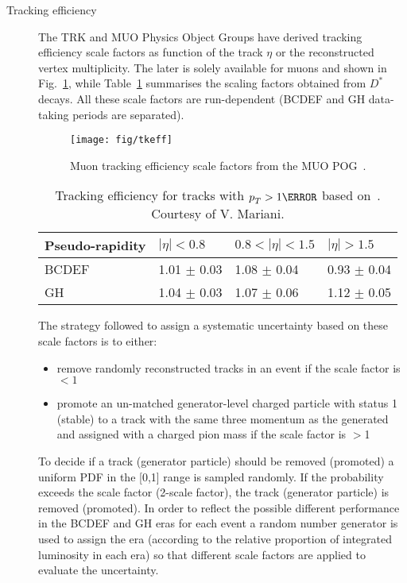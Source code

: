 \begin{description}
\item[Tracking efficiency]
The TRK and MUO Physics Object Groups have derived tracking efficiency scale factors as function of the track $\eta$ or the reconstructed vertex multiplicity. The later is solely available for muons and shown in Fig.~\ref{fig:mutksf}, while Table~\ref{tab:dstartsf} summarises the scaling factors obtained from $D^*$ decays. All these scale factors are run-dependent (BCDEF and GH data-taking periods are separated).

\begin{figure}[htp]
  \centering
  \texttt{[image: fig/tkeff]}%
  \caption{Muon tracking efficiency scale factors from the MUO POG~\cite{twiki:MUO}.}
  \label{fig:mutksf}
\end{figure}

\begin{table}[htb]
\begin{center}
\caption{Tracking efficiency for tracks with $\pt>1\GeV$ based on~\cite{CMS-AN-2015-048,twiki:trkpogeff,CMS-DP-2016-012}.
Courtesy of V. Mariani.}
\label{tab:dstartsf}
\begin{tabular}{llll}
\hline
Pseudo-rapidity & $|\eta|<0.8$ & $0.8<|\eta|<1.5$ & $|\eta|>1.5$ \\
\hline
BCDEF & 1.01 $\pm$ 0.03 & 1.08 $\pm$ 0.04 & 0.93 $\pm$ 0.04 \\
GH & 1.04 $\pm$ 0.03 & 1.07 $\pm$ 0.06 & 1.12 $\pm$ 0.05 \\
\hline
\end{tabular}
\end{center}
\end{table}
The strategy followed to assign a systematic uncertainty based on these scale factors is to either:

\begin{itemize}
\item remove randomly reconstructed tracks in an event if the scale factor is $<1$
\item promote an un-matched generator-level charged particle with status 1 (stable) to a track with the same
three momentum as the generated and assigned with a charged pion mass if the scale factor is $>$1
\end{itemize}

To decide if a track (generator particle) should be removed (promoted) a uniform PDF in the [0,1] range is sampled randomly. If the probability exceeds the scale factor (2-scale factor), the track (generator particle) is removed (promoted). In order to reflect the possible different performance in the BCDEF and GH eras for each event a random number generator is used to assign the era (according to the relative proportion of integrated luminosity in each era) so that different scale factors are applied to evaluate the uncertainty.


\end{description}
